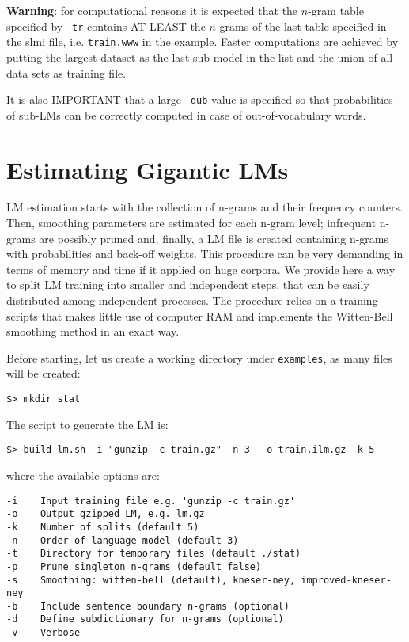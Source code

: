 \documentclass[11pt]{article}
\begin{document}
\noindent
{\bf Warning}: for  computational reasons it  is expected that  the $n$-gram
table  specified by {\tt -tr}  contains AT  LEAST the  $n$-grams of  the last
table specified in the slmi file, i.e. {\tt train.www} in  the example.
Faster computations are achieved by putting the largest dataset as the
last sub-model in the list and the union of all data sets as training
file.

\noindent
It is  also IMPORTANT  that a  large {\tt -dub} value  is specified  so that
probabilities  of  sub-LMs  can  be  correctly  computed  in  case  of
out-of-vocabulary words.

\newpage
\section{Estimating Gigantic LMs}
\label{sec:giganticLM}
LM estimation starts with the collection of n-grams and their frequency counters. Then, 
smoothing parameters are estimated for each n-gram level; infrequent n-grams are
possibly pruned and, finally, a LM file is created containing n-grams with probabilities and 
back-off weights.  This procedure can be very demanding in terms of memory and
time if it applied on huge corpora.   We provide here a way to split LM training  into smaller and independent steps, that can be easily distributed among independent processes. The  
procedure relies on a training scripts that makes little use of computer RAM and implements 
the  Witten-Bell smoothing method in an exact way.  

\noindent
Before starting, let us create a working directory under {\tt examples}, as many files will be created:

\begin{verbatim}
$> mkdir stat
\end{verbatim}

The script to generate the LM is:

\begin{verbatim}
$> build-lm.sh -i "gunzip -c train.gz" -n 3  -o train.ilm.gz -k 5
\end{verbatim}
where the available options are:

\begin{verbatim}
-i    Input training file e.g. 'gunzip -c train.gz'
-o    Output gzipped LM, e.g. lm.gz
-k    Number of splits (default 5)
-n    Order of language model (default 3)
-t    Directory for temporary files (default ./stat)
-p    Prune singleton n-grams (default false)
-s    Smoothing: witten-bell (default), kneser-ney, improved-kneser-ney 
-b    Include sentence boundary n-grams (optional)
-d    Define subdictionary for n-grams (optional)
-v    Verbose
\end{verbatim}
\end{document}

